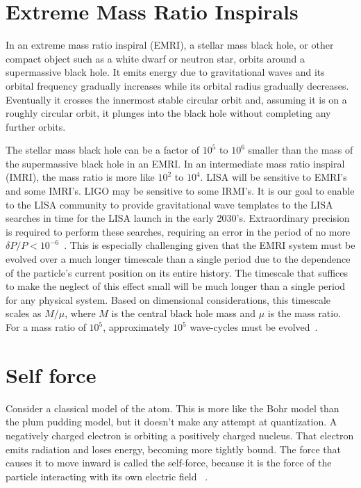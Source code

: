 \section{Extreme Mass Ratio Inspirals}
In an extreme mass ratio inspiral (EMRI), a stellar mass black hole, or other compact object such as a white dwarf or neutron star, orbits around a supermassive black hole. It emits energy due to gravitational waves and its orbital frequency gradually increases while its orbital radius gradually decreases. Eventually it crosses the innermost stable circular orbit and, assuming it is on a roughly circular orbit, it plunges into the black hole without completing any further orbits.

The stellar mass black hole can be a factor of $10^5$ to $10^6$ smaller than the mass of the supermassive black hole in an EMRI. In an intermediate mass ratio inspiral (IMRI), the mass ratio is more like $10^2$ to $10^4$. LISA will be sensitive to EMRI's and some IMRI's. LIGO may be sensitive to some IRMI's. It is our goal to enable to the LISA community to provide gravitational wave templates to the LISA searches in time for the LISA launch in the early 2030's. Extraordinary precision is required to perform these searches, requiring an error in the period of no more $\delta P/P<10^{-6}$~\cite{LISA02062017}. This is especially challenging given that the EMRI system must be evolved over a much longer timescale than a single period due to the dependence of the particle's current position on its entire history. The timescale that suffices to make the neglect of this effect small will be much longer than a single period for any physical system. Based on dimensional considerations, this timescale scales as $M/\mu$, where $M$ is the central black hole mass and $\mu$ is the mass ratio. For a mass ratio of $10^5$, approximately $10^5$ wave-cycles must be evolved~\cite{LISA02062017}.

\section{Self force}

Consider a classical model of the atom. This is more like the Bohr model than the plum pudding model, but it doesn't make any attempt at quantization. A negatively charged electron is orbiting a positively charged nucleus. That electron emits radiation and loses energy, becoming more tightly bound. The force that causes it to move inward is called the self-force, because it is the force of the particle interacting with its own electric field ~\cite{dirac1938}.

